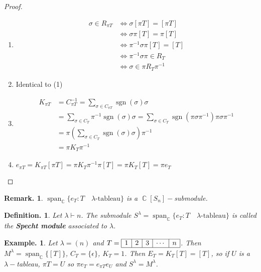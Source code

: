 \documentclass[11pt, a4paper]{memoir}
\DeclareMathOperator{\C}{{\mathbb{C}}}
\theoremstyle{change}
\theoremstyle{plain}
\theoremstyle{nonumberplain}
\newtheorem{definition}{Definition.}
\newtheorem{example}{Example.}
\newtheorem{remark}{Remark.}
\newtheorem{proof}{Proof}
\DeclareMathOperator{\spn}{span}
\DeclareMathOperator{\sgn}{sgn}
\numberwithin{equation}{section}
\begin{document}
\begin{proof}
    \begin{enumerate}[nl]
        \item
            \begin{align*}
                \sigma\in R_{\pi T} &\iff \sigma[\pi T]=[\pi T]\\
                                    &\iff \sigma\pi[T]=\pi[T]\\
                                    &\iff \pi^{-1}\sigma\pi[T]=[T]\\
                                    &\iff\pi^{-1}\sigma\pi\in R_T\\
                                    &\iff\sigma\in\pi R_T\pi^{-1}
            \end{align*}
        \item Identical to (1)
        \item
            \begin{align*}
                K_{\pi T}&=C_{\pi T}^{-1}=\sum_{\sigma\in C_{\pi T}}\sgn(\sigma)\sigma\\
                         &= \sum_{\sigma\in C_T}\pi^{-1}\sgn(\sigma)\sigma=\sum_{\sigma\in C_T}\sgn(\pi\sigma\pi^{-1})\pi\sigma\pi^{-1}\\
                         &= \pi\left(\sum_{\sigma\in C_T}\sgn(\sigma)\sigma\right)\pi^{-1}\\
                         &= \pi K_T\pi^{-1}
            \end{align*}
        \item $e_{\pi T}=K_{\pi T}[\pi T]=\pi K_T\pi^{-1}\pi[T]=\pi K_T[T]=\pi e_T$
    \end{enumerate}
\end{proof}
\begin{remark}
    $\spn_{\C}\{e_T:T\quad\lambda\text{-tableau}\}$ is a $\C[S_n]-$submodule.
\end{remark}
\begin{definition}
    Let $\lambda\vdash n$.
    The submodule $S^\lambda=\spn_{\C}\{e_T:T\quad\lambda\text{-tableau}\}$ is called the \textbf{Specht module} associated to $\lambda$.
\end{definition}
\begin{example}
    Let $\lambda=(n)$ and $T=\begin{array}{|c|c|c|c|c|}\hline 1&2&3&\cdots&n\\\hline\end{array}$.
    Then $M^\lambda=\spn_{\C}\{[T]\}$, $C_T=\{\epsilon\}$, $K_T=1$.
    Then $E_T=K_T[T]=[T]$, so if $U$ is a $\lambda-$tableau, $\pi T=U$ so $\pi e_T=e_{\pi T}e_U$ and $S^\lambda=M^\lambda$.
\end{example}
\end{document}
